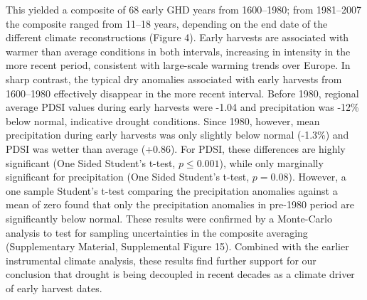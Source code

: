 \documentclass[final]{nature}
\begin{document}
\indent This yielded a composite of 68 early GHD years from 1600--1980; from 1981--2007 the composite ranged from 11--18 years, depending on the end date of the different climate reconstructions (Figure 4). Early harvests are associated with warmer than average conditions in both intervals, increasing in intensity in the more recent period, consistent with large-scale warming trends over Europe. In sharp contrast, the typical dry anomalies associated with early harvests from 1600--1980 effectively disappear in the more recent interval. Before 1980, regional average PDSI values during early harvests were -1.04 and precipitation was -12\% below normal, indicative drought conditions. Since 1980, however, mean precipitation during early harvests was only slightly below normal (-1.3\%) and PDSI was wetter than average (+0.86). For PDSI, these differences are highly significant (One Sided Student's t-test, $p\le0.001$), while only marginally significant for precipitation (One Sided Student's t-test, $p=0.08$). However, a one sample Student's t-test comparing the precipitation anomalies against a mean of zero found that only the precipitation anomalies in pre-1980 period are significantly below normal. These results were confirmed by a Monte-Carlo analysis to test for sampling uncertainties in the composite averaging (Supplementary Material, Supplemental Figure 15). Combined with the earlier instrumental climate analysis, these results find further support for our conclusion that drought is being decoupled in recent decades as a climate driver of early harvest dates.
\end{document}
